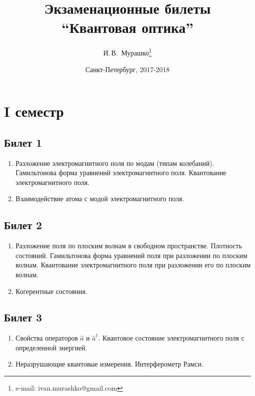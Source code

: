 \documentclass[12pt,a4paper]{article}
\begin{document}
\Russian

\title{Экзаменационные билеты \\ ``Квантовая оптика''}
\author{И.\,В.~Мурашко\thanks{e-mail: ivan.murashko@gmail.com}}
\date{Санкт-Петербург, 2017-2018}
\maketitle
\newpage


\section*{I семестр}

\subsection*{Билет 1} 
\begin{enumerate}
\item Разложение электромагнитного поля по модам (типам колебаний).
Гамильтонова форма уравнений электромагнитного поля. Квантование
электромагнитного поля. 
\item  Взаимодействие атома с модой электромагнитного поля. 
\end{enumerate}

\subsection*{Билет 2} 
\begin{enumerate}
\item Разложение поля по плоским волнам в свободном пространстве. 
Плотность состояний. Гамильтонова форма уравнений поля при разложении по плоским
волнам. Квантование электромагнитного поля при разложении его по
плоским волнам.
\item Когерентные состояния. 
\end{enumerate}

\subsection*{Билет 3} 
\begin{enumerate}
\item Свойства операторов $ \hat a $ и $ \hat a ^\dag $. Квантовое
состояние электромагнитного поля  с определенной энергией. 
\item Неразрушающие квантовые измерения. Интерферометр Рамси. 
\end{enumerate}
\end{document}
